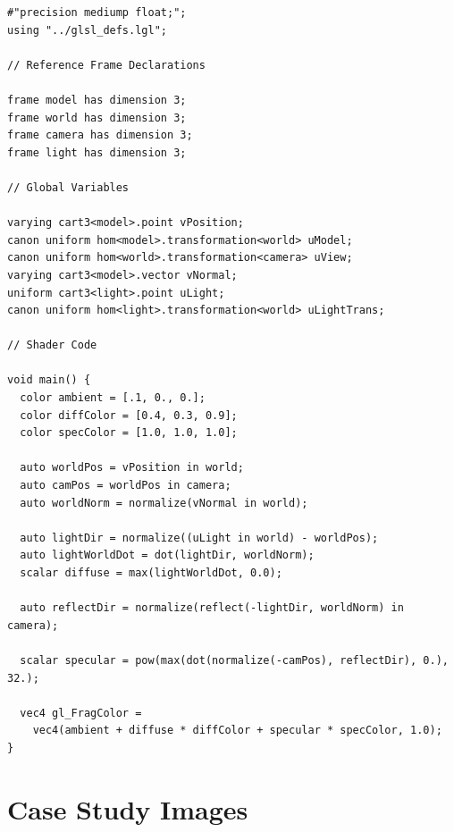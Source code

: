 \documentclass[acmsmall,review,anonymous]{acmart}
\begin{document}
\begin{verbatim}
#"precision mediump float;";
using "../glsl_defs.lgl";

// Reference Frame Declarations

frame model has dimension 3;
frame world has dimension 3;
frame camera has dimension 3;
frame light has dimension 3;

// Global Variables

varying cart3<model>.point vPosition;
canon uniform hom<model>.transformation<world> uModel;
canon uniform hom<world>.transformation<camera> uView;
varying cart3<model>.vector vNormal;
uniform cart3<light>.point uLight;
canon uniform hom<light>.transformation<world> uLightTrans;

// Shader Code

void main() {
  color ambient = [.1, 0., 0.];
  color diffColor = [0.4, 0.3, 0.9];
  color specColor = [1.0, 1.0, 1.0];

  auto worldPos = vPosition in world;
  auto camPos = worldPos in camera;
  auto worldNorm = normalize(vNormal in world);

  auto lightDir = normalize((uLight in world) - worldPos);
  auto lightWorldDot = dot(lightDir, worldNorm);
  scalar diffuse = max(lightWorldDot, 0.0);

  auto reflectDir = normalize(reflect(-lightDir, worldNorm) in camera);

  scalar specular = pow(max(dot(normalize(-camPos), reflectDir), 0.), 32.);

  vec4 gl_FragColor = 
    vec4(ambient + diffuse * diffColor + specular * specColor, 1.0);
}
\end{verbatim}

\section{Case Study Images}
\end{document}
